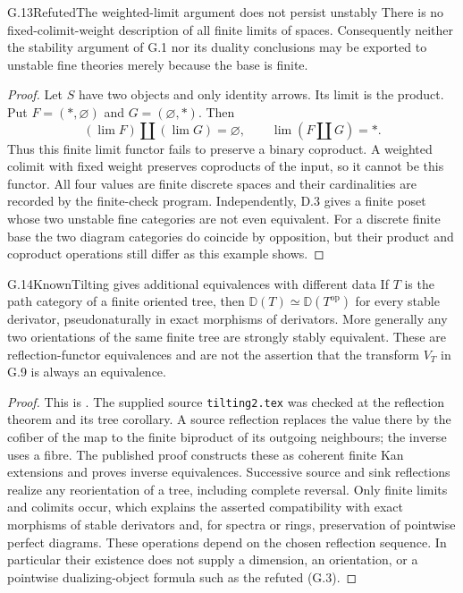 \begin{claim}{G.13}{Refuted}{The weighted-limit argument does not persist unstably}
There is no fixed-colimit-weight description of all finite limits
of spaces. Consequently neither the stability argument of G.1
nor its duality conclusions may be exported to unstable fine
theories merely because the base is finite.
\end{claim}
\begin{proof}
Let $S$ have two objects and only identity arrows. Its limit is
the product. Put $F=(*,\varnothing)$ and
$G=(\varnothing,*)$. Then
\[
 (\lim F)\amalg(\lim G)=\varnothing,
 \qquad \lim(F\amalg G)=*.
\]
Thus this finite limit functor fails to preserve a binary
coproduct. A weighted colimit with fixed weight preserves
coproducts of the input, so it cannot be this functor. All four
values are finite discrete spaces and their cardinalities are
recorded by the finite-check program. Independently, D.3 gives
a finite poset whose two unstable fine categories are not even
equivalent. For a discrete finite base the two diagram categories
do coincide by opposition, but their product and coproduct
operations still differ as this example shows.
\end{proof}

\begin{claim}{G.14}{Known}{Tilting gives additional equivalences with different data}
If $T$ is the path category of a finite oriented tree, then
$\mathbb D(T)\simeq\mathbb D(T^{\mathrm{op}})$ for every stable
derivator, pseudonaturally in exact morphisms of derivators.
More generally any two orientations of the same finite tree
are strongly stably equivalent. These are reflection-functor
equivalences and are not the assertion that the transform
$V_T$ in G.9 is always an equivalence.
\end{claim}
\begin{proof}
This is \citet[Theorem 9.19 and Corollary 9.23]{DGGrothStovicek2016}.
The supplied source \texttt{tilting2.tex} was checked at the
reflection theorem and its tree corollary. A source reflection
replaces the value there by the cofiber of the map to the finite
biproduct of its outgoing neighbours; the inverse uses a fibre.
The published proof constructs these as coherent finite Kan
extensions and proves inverse equivalences. Successive source
and sink reflections realize any reorientation of a tree,
including complete reversal. Only finite limits and colimits
occur, which explains the asserted compatibility with exact
morphisms of stable derivators and, for spectra or rings,
preservation of pointwise perfect diagrams. These operations
depend on the chosen reflection sequence. In particular their
existence does not supply a dimension, an orientation, or a
pointwise dualizing-object formula such as the refuted (G.3).
\end{proof}
